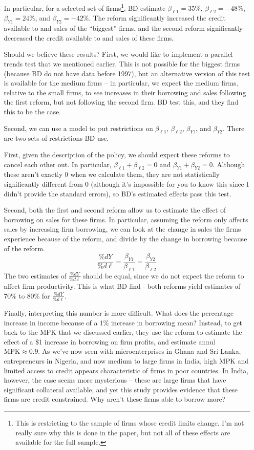 \documentclass[12pt,english]{article}
\begin{document}
In particular, for a selected set of firms\footnote{This is restricting to the sample of firms whose credit limits change. I'm not really sure why this is done in the paper, but not all of these effects are available for the full sample.}, BD estimate $\beta_{\ell1} = 35\%$, $\beta_{\ell2} = -48\%$, $\beta_{Y1} = 24\%$, and $\beta_{Y2} = -42\%$. The reform significantly increased the credit available to and sales of the ``biggest'' firms, and the second reform significantly decreased the credit available to and sales of these firms.

Should we believe these results? First, we would like to implement a parallel trends test that we mentioned earlier. This is not possible for the biggest firms (because BD do not have data before 1997), but an alternative version of this test is available for the medium firms -- in particular, we expect the medium firms, relative to the small firms, to see increases in their borrowing and sales following the first reform, but not following the second firm. BD test this, and they find this to be the case.

Second, we can use a model to put restrictions on $\beta_{\ell1}$, $\beta_{\ell2}$, $\beta_{Y1}$, and $\beta_{Y2}$. There are two sets of restrictions BD use. 

First, given the description of the policy, we should expect these reforms to cancel each other out. In particular, $\beta_{\ell1} + \beta_{\ell2} = 0$ and $\beta_{Y1} + \beta_{Y2} = 0$. Although these aren't exactly 0 when we calculate them, they are not statistically significantly different from 0 (although it's impossible for you to know this since I didn't provide the standard errors), so BD's estimated effects pass this test.

Second, both the first and second reform allow us to estimate the effect of borrowing on sales for these firms. In particular, assuming the reform only affects sales by increasing firm borrowing, we can look at the change in sales the firms experience because of the reform, and divide by the change in borrowing because of the reform.
$$ \frac{\%dY}{\%d\ell} = \frac{\beta_{Y1}}{\beta_{\ell1}} = \frac{\beta_{Y2}}{\beta_{\ell2}} $$
The two estimates of $\frac{\%dY}{\%d\ell}$ should be equal, since we do not expect the reform to affect firm productivity. This is what BD find - both reforms yield estimates of 70\% to 80\% for $\frac{\%dY}{\%d\ell}$.

Finally, interpreting this number is more difficult. What does the percentage increase in income because of a 1\% increase in borrowing mean? Instead, to get back to the MPK that we discussed earlier, they use the reform to estimate the effect of a \$1 increase in borrowing on firm profits, and estimate annul $\text{MPK} \approx 0.9$. As we've now seen with microenterprises in Ghana and Sri Lanka, entrepreneurs in Nigeria, and now medium to large firms in India, high MPK and limited access to credit appears characteristic of firms in poor countries. In India, however, the case seems more mysterious -- these are large firms that have significant collateral available, and yet this study provides evidence that these firms are credit constrained. Why aren't these firms able to borrow more?
\end{document}
